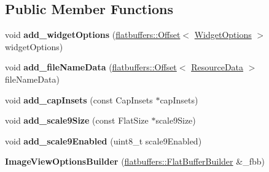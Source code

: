 \subsection*{Public Member Functions}
\begin{DoxyCompactItemize}
\item 
\mbox{\label{structflatbuffers_1_1ImageViewOptionsBuilder_ab4a6d822b9b8bb465e63cb2c61353954}} 
void {\bfseries add\+\_\+widget\+Options} (\hyperlink{structflatbuffers_1_1Offset}{flatbuffers\+::\+Offset}$<$ \hyperlink{structflatbuffers_1_1WidgetOptions}{Widget\+Options} $>$ widget\+Options)
\item 
\mbox{\label{structflatbuffers_1_1ImageViewOptionsBuilder_a13aa08de468d08f4e260f3143a3c1ce0}} 
void {\bfseries add\+\_\+file\+Name\+Data} (\hyperlink{structflatbuffers_1_1Offset}{flatbuffers\+::\+Offset}$<$ \hyperlink{structflatbuffers_1_1ResourceData}{Resource\+Data} $>$ file\+Name\+Data)
\item 
\mbox{\label{structflatbuffers_1_1ImageViewOptionsBuilder_adff4f11d16b06dd63b760606e109b9de}} 
void {\bfseries add\+\_\+cap\+Insets} (const Cap\+Insets $\ast$cap\+Insets)
\item 
\mbox{\label{structflatbuffers_1_1ImageViewOptionsBuilder_a2a0e7ced20ad208e321664bcd532b7ca}} 
void {\bfseries add\+\_\+scale9\+Size} (const Flat\+Size $\ast$scale9\+Size)
\item 
\mbox{\label{structflatbuffers_1_1ImageViewOptionsBuilder_af87456c01219834ea424820c4779c1df}} 
void {\bfseries add\+\_\+scale9\+Enabled} (uint8\+\_\+t scale9\+Enabled)
\item 
\mbox{\label{structflatbuffers_1_1ImageViewOptionsBuilder_aeba1f0dbef8693058fef71b817e1e5ef}} 
{\bfseries Image\+View\+Options\+Builder} (\hyperlink{classflatbuffers_1_1FlatBufferBuilder}{flatbuffers\+::\+Flat\+Buffer\+Builder} \&\+\_\+fbb)
\item 
\mbox{\label{structflatbuffers_1_1ImageViewOptionsBuilder_af9a0d2e18f8de19e5db3c657ddb43a43}} 

\end{DoxyCompactItemize}
